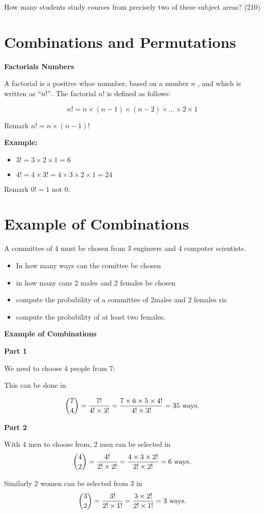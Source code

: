 \documentclass[]{report}
\begin{document}
	How many students study courses from precisely two of these subject
	areas? (210)
	\newpage
	\section{ Combinations and Permutations }
	
	{
		\textbf{Factorials Numbers}
		
		A factorial is a positive whoe numnber, based on a number $n$ , and which is written as $``n!"$. The factorial $n!$ is defined as follows:
		
		\[n!  =n \times (n-1) \times (n-2) \times \ldots \times 2 \times 1 \]
		
		Remark $n!  =n \times (n-1)!$\\ \bigskip
		
		\textbf{ Example: }
		
		\begin{itemize}
			\item $3!  = 3 \times 2  \times 1 = 6 $
			
			\item $4!  = 4 \times 3! = 4 \times 3 \times 2 \times 1 = 24$
		\end{itemize}
		Remark $0! = 1$ not $0$.
		
		

	

		\section{Example of Combinations}
		
		A committee of 4 must be chosen from 3 engineers and 4 computer scientists. 
		\begin{itemize}
			\item In how many ways can the comittee be chosen
			\item in how many cans 2 males and 2 females be chosen
			\item compute the probability of a committee of 2males and 2 females ris
			\item compute the probability of at least two females.
		\end{itemize}
	
	
\textbf{Example of Combinations}
		
		\textbf{Part 1}
		
		We need to choose 4 people from 7:
		
		This can be done in 
		
		\[
		{7 \choose 4} = {7!  \over 4! \times 3!} =  {7 \times 6 \times 5 \times 4!  \over 4! \times 3!} = 35 \mbox{ ways.}
		\]
		
		
		\textbf{Part 2}
		
		With 4 men to choose from, 2 men can be selected in \[
		{4 \choose 2} = {4!  \over 2! \times 2!} =  {4 \times 3 \times 2!  \over 2! \times 2!} = 6\mbox{ ways.}
		\]
		
		Similarly  2 women can be selected from 3 in 
		\[
		{3 \choose 2} = {3!  \over 2! \times1!} =  {3 \times 2!  \over 2! \times 1!} = 3\mbox{ ways.}
		\]
		
	}
\end{document}
